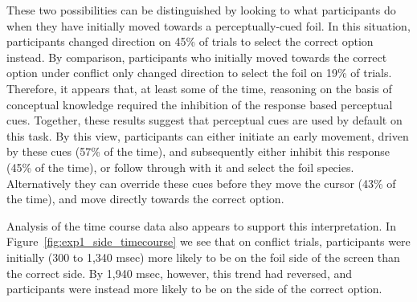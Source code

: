 These two possibilities can be distinguished by looking to
what participants do when they have initially moved towards
a perceptually-cued foil.
In this situation, participants changed direction on 45\% of trials
to select the correct option instead.
By comparison, participants who initially moved towards the correct option under conflict
only changed direction to select the foil on 19\% of trials.
Therefore, it appears that, at least some of the time,
reasoning on the basis of conceptual knowledge required
the inhibition of the response based perceptual cues.
Together, these results suggest that perceptual cues
are used by default on this task.
By this view,  participants can either
initiate an early movement, driven by these cues (57\% of the time),
and subsequently either inhibit this response (45\% of the time),
or follow through with it and select the foil species.
Alternatively they can override these cues
before they move the cursor (43\% of the time),
and move directly towards the correct option.

Analysis of the time course data also appears to support this interpretation.
In Figure~\ref{fig:exp1_side_timecourse} we see that
on conflict trials, participants were initially (300 to 1,340 msec)
more likely to be on the foil side of the screen than the correct side.
By 1,940 msec, however, this trend had reversed,
and participants were instead more likely to be on the side of the correct option.


